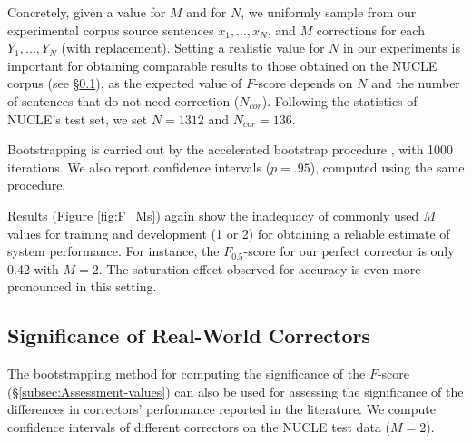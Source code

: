 \documentclass[a4paper, 11pt]{article}
\begin{document}
Concretely, given a value for $M$ and for $N$, we uniformly sample from our experimental corpus source sentences $x_1,...,x_N$, and $M$ corrections for each $Y_1,...,Y_N$ (with replacement).
Setting a realistic value for $N$ in our experiments is important for obtaining comparable results to those obtained on the NUCLE corpus (see \S\ref{sec:real_world}),
as the expected value of $F$-score depends on $N$ and the number of sentences that do not need correction ($N_{cor}$).
Following the statistics of NUCLE's test set, we set $N=1312$ and $N_{cor}=136$.

Bootstrapping is carried out by the accelerated bootstrap procedure \cite{efron1987better}, with 1000 iterations.
We also report confidence intervals ($p=.95$), computed using the same procedure.%
%

Results (Figure \ref{fig:F_Ms}) again show the inadequacy of commonly used
$M$ values for training and development (1 or 2) for obtaining a reliable estimate
of system performance.
For instance, the $F_{0.5}$-score for our perfect corrector is only 0.42 with $M=2$.
The saturation effect observed for accuracy is even more pronounced in this setting.
	\vspace{-0.1cm}
\subsection{Significance of Real-World Correctors}\label{sec:real_world}
	\vspace{-0.1cm}

The bootstrapping method for computing the significance of the $F$-score (\S\ref{subsec:Assessment-values}) 
can also be used for assessing the significance of the differences in correctors' performance reported in the literature.
We compute confidence intervals of different correctors on the NUCLE
test data ($M=2$).
\end{document}
